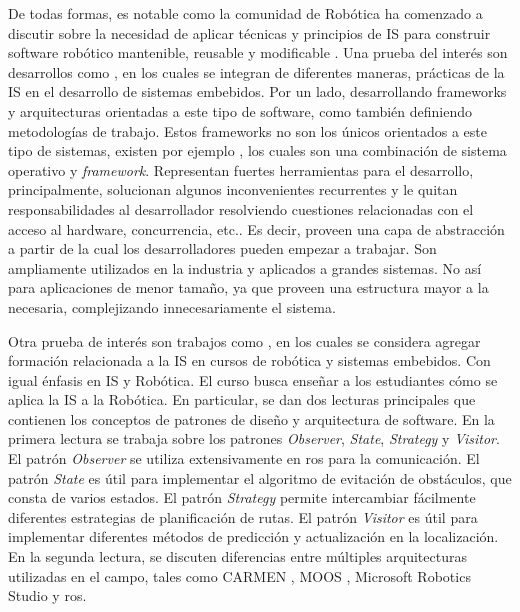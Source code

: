 De todas formas, es notable como la comunidad de Robótica ha comenzado a discutir sobre la necesidad de aplicar técnicas y principios de IS para construir software robótico mantenible, reusable y modificable \cite{Brugali2009, mejoras-2}. Una prueba del interés son desarrollos como \cite{FernandezMadrigal2003, model,model1,model2,model3}, en los cuales se integran de diferentes maneras, prácticas de la IS en el desarrollo de sistemas embebidos. Por un lado, desarrollando \glspl{framework} y arquitecturas orientadas a este tipo de software, como también definiendo metodologías de trabajo. Estos \glspl{framework} no son los únicos orientados a este tipo de sistemas, existen por ejemplo \cite{framework-1, framework-ros}, los cuales son una combinación de sistema operativo y \textit{framework}. Representan fuertes herramientas para el desarrollo, principalmente, solucionan algunos inconvenientes recurrentes y le quitan responsabilidades al desarrollador resolviendo cuestiones relacionadas con el acceso al hardware, concurrencia, etc.. Es decir, proveen una capa de abstracción a partir de la cual los desarrolladores pueden empezar a trabajar. Son ampliamente utilizados en la industria y aplicados a grandes sistemas. No así para aplicaciones de menor tamaño, ya que proveen una estructura mayor a la necesaria, complejizando innecesariamente el sistema.

Otra prueba de interés son trabajos como \cite{Shin15fase}, en los cuales se considera agregar formación relacionada a la \gls{IS} en cursos de robótica y sistemas embebidos. Con igual énfasis en \gls{IS} y Robótica. El curso busca enseñar a los estudiantes cómo se aplica la \gls{IS} a la Robótica. En particular, se dan dos lecturas principales que contienen los conceptos de patrones de diseño y arquitectura de software. En la primera lectura se trabaja sobre los patrones \textit{Observer}, \textit{State}, \textit{Strategy} y \textit{Visitor}. El patrón \textit{Observer} se utiliza extensivamente en \gls{ros}\cite{framework-ros} para la comunicación. El patrón \textit{State} es útil para implementar el algoritmo de evitación de obstáculos, que consta de varios estados. El patrón \textit{Strategy} permite intercambiar fácilmente diferentes estrategias de planificación de rutas. El patrón \textit{Visitor} es útil para implementar diferentes métodos de predicción y actualización en la localización. En la segunda lectura, se discuten diferencias entre múltiples arquitecturas utilizadas en el campo, tales como CARMEN \cite{carmen}, MOOS \cite{moos}, Microsoft Robotics Studio \cite{microsoft} y \gls{ros}\cite{framework-ros}. 


